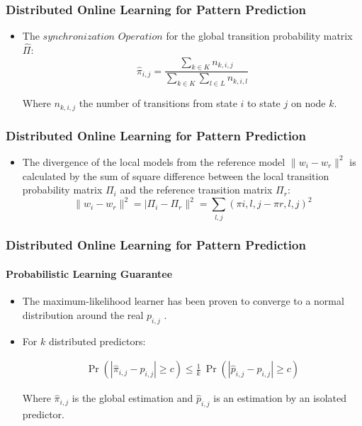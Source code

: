 \frame
{
	\frametitle{Distributed Online Learning for Pattern Prediction}
	\begin{itemize}[]

	\item<1-> The
 $synchronization$ $ Operation$ for the global transition probability matrix $\hat{\Pi}$:
 \begin{equation*}
 \label{eq:dis_pi_estim}
 \hat{\pi}_{i,j} = \frac{\sum_{k \in K} n_{k,i,j}}{\sum_{k \in K} \sum_{l \in L} n_{k,i,l}}
 \end{equation*}

Where $n_{k,i,j}$ the number of transitions from state $i$ to state $j$ on node $k$.
	
\end{itemize}
}

\frame
{
	\frametitle{Distributed Online Learning for Pattern Prediction}
	\begin{itemize}[]
		
		\item<1->The divergence of the local models from the reference model $\|w_i - w_r\|^2$ is calculated by the sum of square difference between the local transition probability matrix $\Pi_i$ and the reference transition matrix $\Pi_r$:
		\begin{equation*}
		\label{eq:dis_pi_varinace}
		\|w_i - w_r\|^2=|\Pi_i - \Pi_r\|^2=\sum_{l,j} (\pi{i,l,j} -\pi{r,l,j})^2
		\end{equation*}
		
	\end{itemize}
}


\frame
{
	\frametitle{Distributed Online Learning for Pattern Prediction}
	\framesubtitle{Probabilistic Learning Guarantee}
	\begin{itemize}[]
		
		\item<1-> The maximum-likelihood learner has been proven to converge to  a normal distribution around the real ${p}_{i,j}$ \cite{anderson1957statistical}.
	
   \item<1-> For $k$ distributed \pmcmr predictors:
		
		\begin{equation*}
		\begin{aligned}
		\label{eq:guarantee}
		\Pr\left( |\hat{\pi}_{i,j} - {p}_{i,j}| \geq c \right) \leq
		\frac{1}{k}\ \Pr\left( |\hat{p}_{i,j} - {p}_{i,j}| \geq c \right)
		\end{aligned}
		\end{equation*}
		
\vspace{1cm}Where $\hat{\pi}_{i,j}$ is the global estimation and $\hat{p}_{i,j}$ is an estimation by an isolated predictor.

	\end{itemize}
}